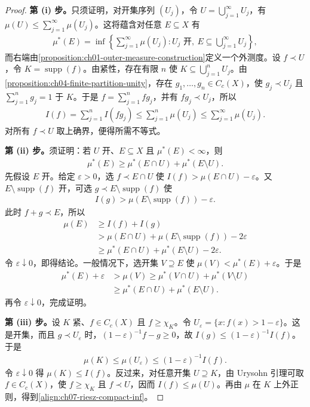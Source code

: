 \documentclass[../../main.tex]{subfiles}
\begin{document}
\begin{proof}
\textbf{第 (i) 步。}只须证明，对开集序列 $(U_j)$，令 $U=\bigcup_{j=1}^\infty U_j$，有 $\mu(U)\leqslant\sum_{j=1}^\infty\mu(U_j)$。这将蕴含对任意 $E\subseteq X$ 有
\begin{align*}
\mu^*(E)=\inf\left\{\sum_{j=1}^\infty\mu(U_j):
U_j\text{ 开},\ E\subseteq\bigcup_{j=1}^\infty U_j\right\},
\end{align*}
而右端由\cref{proposition:ch01-outer-measure-construction}定义一个外测度。设 $f\prec U$，令 $K=\operatorname{supp}(f)$。由紧性，存在有限 $n$ 使 $K\subseteq\bigcup_{j=1}^n U_j$。由\cref{proposition:ch04-finite-partition-unity}，存在 $g_1,\ldots,g_n\in C_c(X)$，使 $g_j\prec U_j$ 且 $\sum_{j=1}^n g_j=1$ 于 $K$。于是 $f=\sum_{j=1}^nfg_j$，并有 $fg_j\prec U_j$，所以
\begin{align*}
I(f)=\sum_{j=1}^nI(fg_j)
\leqslant\sum_{j=1}^n\mu(U_j)
\leqslant\sum_{j=1}^\infty\mu(U_j).
\end{align*}
对所有 $f\prec U$ 取上确界，便得所需不等式。

\textbf{第 (ii) 步。}须证明：若 $U$ 开、$E\subseteq X$ 且 $\mu^*(E)<\infty$，则
\begin{align*}
\mu^*(E)\geqslant\mu^*(E\cap U)+\mu^*(E\setminus U).
\end{align*}
先假设 $E$ 开。给定 $\varepsilon>0$，选 $f\prec E\cap U$ 使 $I(f)>\mu(E\cap U)-\varepsilon$。又 $E\setminus\operatorname{supp}(f)$ 开，可选 $g\prec E\setminus\operatorname{supp}(f)$ 使
\begin{align*}
I(g)>\mu(E\setminus\operatorname{supp}(f))-\varepsilon.
\end{align*}
此时 $f+g\prec E$，所以
\begin{align*}
\mu(E)&\geqslant I(f)+I(g)\\
&>\mu(E\cap U)+\mu(E\setminus\operatorname{supp}(f))-2\varepsilon\\
&\geqslant\mu^*(E\cap U)+\mu^*(E\setminus U)-2\varepsilon.
\end{align*}
令 $\varepsilon\downarrow0$，即得结论。一般情况下，选开集 $V\supseteq E$ 使 $\mu(V)<\mu^*(E)+\varepsilon$。于是
\begin{align*}
\mu^*(E)+\varepsilon&>\mu(V)
\geqslant\mu^*(V\cap U)+\mu^*(V\setminus U)\\
&\geqslant\mu^*(E\cap U)+\mu^*(E\setminus U).
\end{align*}
再令 $\varepsilon\downarrow0$，完成证明。

\textbf{第 (iii) 步。}设 $K$ 紧、$f\in C_c(X)$ 且 $f\geqslant\chi_K$。令 $U_\varepsilon=\{x:f(x)>1-\varepsilon\}$。这是开集，而且 $g\prec U_\varepsilon$ 时，$(1-\varepsilon)^{-1}f-g\geqslant0$，故 $I(g)\leqslant(1-\varepsilon)^{-1}I(f)$。于是
\begin{align*}
\mu(K)\leqslant\mu(U_\varepsilon)
\leqslant(1-\varepsilon)^{-1}I(f).
\end{align*}
令 $\varepsilon\downarrow0$ 得 $\mu(K)\leqslant I(f)$。反过来，对任意开集 $U\supseteq K$，由 Urysohn 引理可取 $f\in C_c(X)$，使 $f\geqslant\chi_K$ 且 $f\prec U$，因而 $I(f)\leqslant\mu(U)$。再由 $\mu$ 在 $K$ 上外正则，得到\eqref{align:ch07-riesz-compact-inf}。


\end{proof}
\end{document}

